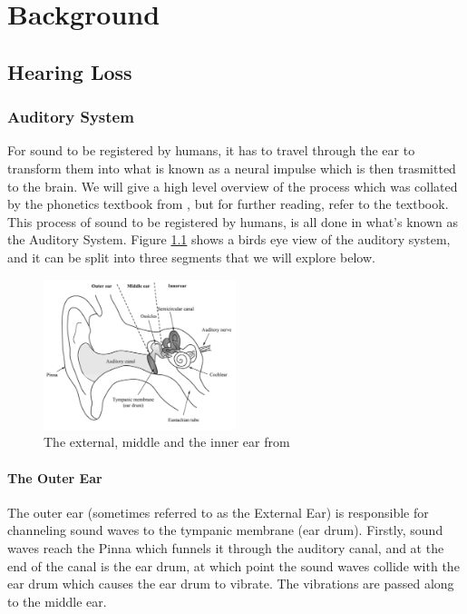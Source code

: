 \documentclass[logo,bsc,singlespacing,parskip,online]{infthesis}
\begin{document}
\chapter{Background}

\section{Hearing Loss}
\subsection{Auditory System}
For sound to be registered by humans, it has to travel through the ear to transform them into
what is known as a neural impulse which is then trasmitted to the brain. We will 
give a high level overview of the process which was collated by the phonetics textbook from \citet{Wayland2018Phonetics},
 but for further reading, refer to the textbook. 
 This process of sound to be registered by humans, is all done in what's known as the Auditory System.
 Figure \ref{fig:ear} shows a birds eye view of the auditory system, and it can be split into three segments
 that we will explore below.

\begin{figure}[h]
   \centering
   \includegraphics[width=0.5\textwidth]{wayland-ear}
   \caption{The external, middle and the inner ear from \citet{Wayland2018Phonetics}}
   \label{fig:ear}
\end{figure}

\subsubsection{The Outer Ear}
The outer ear (sometimes referred to as the External Ear) is responsible for channeling sound waves to the tympanic membrane (ear drum). Firstly,
sound waves reach the Pinna which funnels it through the auditory canal, and at the end of the canal 
is the ear drum, at which point the sound waves collide with the ear drum which causes the ear drum to vibrate. 
The vibrations are passed along to the middle ear.
\end{document}
